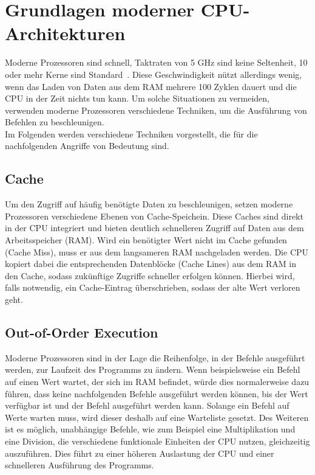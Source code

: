 \section{Grundlagen moderner CPU-Architekturen}
\label{sec:grundlagen-moderner-cpu-architekturen}

Moderne Prozessoren sind schnell, Taktraten von 5 GHz sind keine Seltenheit, 10 oder mehr Kerne sind Standard~\cite{ryzen_9}.
Diese Geschwindigkeit nützt allerdings wenig, wenn das Laden von Daten aus dem RAM mehrere 100 Zyklen dauert und die CPU in der Zeit nichts tun kann.
Um solche Situationen zu vermeiden, verwenden moderne Prozessoren verschiedene Techniken, um die Ausführung von Befehlen zu beschleunigen. \\
Im Folgenden werden verschiedene Techniken vorgestellt, die für die nachfolgenden Angriffe von Bedeutung sind.

\subsection{Cache}
\label{subsec:cache}

Um den Zugriff auf häufig benötigte Daten zu beschleunigen, setzen moderne Prozessoren verschiedene Ebenen von Cache-Speichein.
Diese Caches sind direkt in der CPU integriert und bieten deutlich schnelleren Zugriff auf Daten aus dem Arbeitsspeicher (RAM).
Wird ein benötigter Wert nicht im Cache gefunden (Cache Miss), muss er aus dem langsameren RAM nachgeladen werden.
Die CPU kopiert dabei die entsprechenden Datenblöcke (Cache Lines) aus dem RAM in den Cache, sodass zukünftige Zugriffe schneller erfolgen können.
Hierbei wird, falls notwendig, ein Cache-Eintrag überschrieben, sodass der alte Wert verloren geht.

\subsection{Out-of-Order Execution}
\label{subsec:out-of-order-execution}

Moderne Prozessoren sind in der Lage die Reihenfolge, in der Befehle ausgeführt werden, zur Laufzeit des Programms zu ändern.
Wenn beispielsweise ein Befehl auf einen Wert wartet, der sich im RAM befindet, würde dies normalerweise dazu führen, dass keine nachfolgenden Befehle ausgeführt werden können, bis der Wert verfügbar ist und der Befehl ausgeführt werden kann.
Solange ein Befehl auf Werte warten muss, wird dieser deshalb auf eine Warteliste gesetzt.
Des Weiteren ist es möglich, unabhängige Befehle, wie zum Beispiel eine Multiplikation und eine Division, die verschiedene funktionale Einheiten der CPU nutzen, gleichzeitig auszuführen.
Dies führt zu einer höheren Auslastung der CPU und einer schnelleren Ausführung des Programms.

